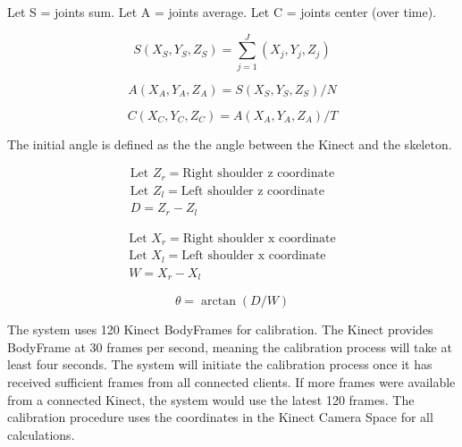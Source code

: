 Let S = joints sum. Let A = joints average. Let C = joints center (over time). 

\begin{equation}
\label{eq:joints_sum}
S(X_S, Y_S, Z_S) = \sum_{j=1}^J (X_j, Y_j, Z_j)
\end{equation}

\begin{equation}
\label{eq:joints_average}
A(X_A, Y_A, Z_A) = S(X_S, Y_S, Z_S) / N
\end{equation}

\begin{equation}
\label{eq:joints_center}
C(X_C, Y_C, Z_C) = A(X_A, Y_A, Z_A) / T
\end{equation}

The initial angle is defined as the the angle between the Kinect and the skeleton.

\begin{equation}
\label{eq:theta_d}
\begin{gathered}
\text{Let } Z_r = \text{Right shoulder z coordinate} \\
\text{Let } Z_l = \text{Left shoulder z coordinate} \\
D = Z_r - Z_l
\end{gathered}
\end{equation}

\begin{equation}
\label{eq:theta_w}
\begin{gathered}
\text{Let } X_r = \text{Right shoulder x coordinate} \\
\text{Let } X_l = \text{Left shoulder x coordinate} \\
W = X_r - X_l
\end{gathered}
\end{equation}

\begin{equation}
\label{eq:theta}
\theta = \arctan(D/W)
\end{equation}

The system uses 120 Kinect BodyFrames for calibration. The Kinect provides BodyFrame at 30 frames per second, meaning the calibration process will take at least four seconds. The system will initiate the calibration process once it has received sufficient frames from all connected clients. If more frames were available from a connected Kinect, the system would use the latest 120 frames. The calibration procedure uses the coordinates in the Kinect Camera Space for all calculations.

